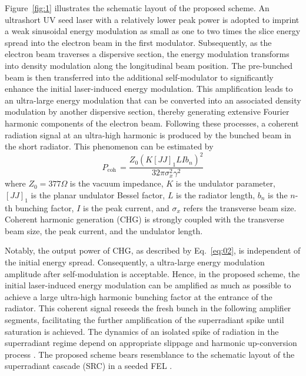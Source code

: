 \documentclass[%
 reprint,
 amsmath,amssymb,
 aps,
]{revtex4-2}
\begin{document}
Figure~\ref{fig:1} illustrates the schematic layout of the proposed scheme. An ultrashort UV seed laser with a relatively lower peak power is adopted to imprint a weak sinusoidal energy modulation as small as one to two times the slice energy spread into the electron beam in the first modulator. Subsequently, as the electron beam traverses a dispersive section, the energy modulation transforms into density modulation along the longitudinal beam position. The pre-bunched beam is then transferred into the additional self-modulator to significantly enhance the initial laser-induced energy modulation. This amplification leads to an ultra-large energy modulation that can be converted into an associated density modulation by another dispersive section, thereby generating extensive Fourier harmonic components of the electron beam. Following these processes, a coherent radiation signal at an ultra-high harmonic is produced by the bunched beam in the short radiator. This phenomenon can be estimated by \citep{Yu2002}
\begin{equation}
    P_{\mathrm{coh\ }}=\frac{Z_0\left(K\left[JJ\right]_1LIb_n\right)^2}{32\pi\sigma_x^2\gamma^2}\label{eq:02}
\end{equation}
where $Z_{0} = 377 \Omega$ is the vacuum impedance, $K$ is the undulator parameter, $[JJ]_{1}$ is the planar undulator Bessel factor, $L$ is the radiator length, $b_{n}$ is the $n$-th bunching factor, $I$ is the peak current, and $\sigma_{x}$ refers the transverse beam size. Coherent harmonic generation (CHG) is strongly coupled with the transverse beam size, the peak current, and the undulator length.

Notably, the output power of CHG, as described by Eq.~\ref{eq:02}, is independent of the initial energy spread. Consequently, a ultra-large energy modulation amplitude after self-modulation is acceptable. Hence, in the proposed scheme, the initial laser-induced energy modulation can be amplified as much as possible to achieve a large ultra-high harmonic bunching factor at the entrance of the radiator. This coherent signal reseeds the fresh bunch in the following amplifier segments, facilitating the further amplification of the superradiant spike until saturation is achieved. The dynamics of an isolated spike of radiation in the superradiant regime depend on appropriate slippage and harmonic up-conversion process \citep{Giannessi2005, Finetti2017, Yang2020}. The proposed scheme bears resemblance to the schematic layout of the superradiant cascade (SRC) in a seeded FEL \citep{Mirian2021}.
\end{document}
